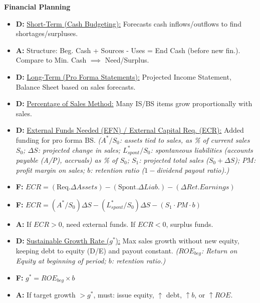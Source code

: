 \documentclass[7pt,landscape]{extarticle} %
\newcommand{\cheatsheetsubsubsection}[1]{%
  \vspace{0.15ex plus 0.05ex minus 0.05ex}%
  \noindent\textbf{\sffamily\scriptsize #1}%
  \par\vspace{0.05ex}%
}
\newcommand{\D}[1]{\textbf{\textcolor{DefColor}{D:}} \uline{#1}}
\newcommand{\F}[1]{\textbf{\textcolor{FormColor}{F:}} #1}
\newcommand{\A}[1]{\textbf{\textcolor{AppColor}{A:}} #1}
\newcommand{\SF}[1]{\textit{\small (#1)}} %
\begin{document}
\begin{multicols*}{4}
  \cheatsheetsubsubsection{Financial Planning}
  \begin{itemize}
    \item \D{Short-Term (Cash Budgeting):} Forecasts cash inflows/outflows to find shortages/surpluses.
    \item \A{Structure: Beg. Cash + Sources - Uses = End Cash (before new fin.). Compare to Min. Cash $\implies$ Need/Surplus.}
    \item \D{Long-Term (Pro Forma Statements):} Projected Income Statement, Balance Sheet based on sales forecasts.
    \item \D{Percentage of Sales Method:} Many IS/BS items grow proportionally with sales.
    \item \D{External Funds Needed (EFN) / External Capital Req. (ECR):} Added funding for pro forma BS.
          \SF{$A^*/S_0$: assets tied to sales, as \% of current sales $S_0$; $\Delta S$: projected change in sales; $L^*_{spont}/S_0$: spontaneous liabilities (accounts payable (A/P), accruals) as \% of $S_0$; $S_1$: projected total sales ($S_0+\Delta S$); $PM$: profit margin on sales; $b$: retention ratio ($1-$dividend payout ratio).}
    \item \F{$ECR = (\text{Req.}\Delta Assets) - (\text{Spont.}\Delta Liab.) - (\Delta Ret.Earnings)$}
    \item \F{$ECR = (A^*/S_0)\Delta S - (L^*_{spont}/S_0)\Delta S - (S_1 \cdot PM \cdot b)$}
    \item \A{If $ECR>0$, need external funds. If $ECR<0$, surplus funds.}
    \item \D{Sustainable Growth Rate ($g^*$):} Max sales growth without new equity, keeping debt to equity (D/E) and payout constant.
          \SF{$ROE_{beg}$: Return on Equity at beginning of period; $b$: retention ratio.}
    \item \F{$g^* = ROE_{beg} \times b$}
    \item \A{If target growth $>g^*$, must: issue equity, $\uparrow$ debt, $\uparrow b$, or $\uparrow ROE$.}
  \end{itemize}
  

\end{multicols*}
\end{document}
